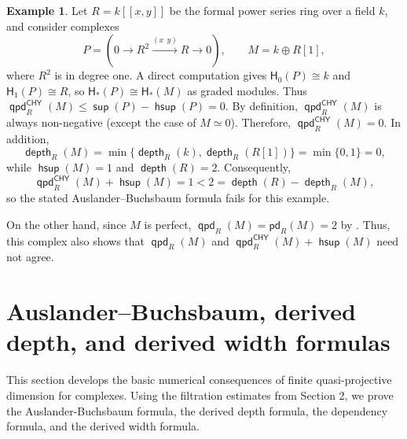 \documentclass[10pt, a4paper,reqno]{amsart}
\theoremstyle{definition}
\newtheorem{eg}[eg]{Example}
\theoremstyle{remark}
\numberwithin{equation}{thm}
\def\sH{\mathsf{H}}
\def\depth{\operatorname{\mathsf{depth}}}
\def\sup{\operatorname{\mathsf{sup}}}
\def\hsup{\operatorname{\mathsf{hsup}}}
\def\pd{\mathsf{pd}}
\def\qpd{\operatorname{\mathsf{qpd}}}
\begin{document}
\begin{eg}\label{eg:homology}
Let $R=k[[x,y]]$ be the formal power series ring over a field $k$, and consider complexes
\[
P=(0\longrightarrow R^2\xrightarrow{(x\ \ y)}R\longrightarrow0),\qquad M=k\oplus R[1],
\]
where $R^2$ is in degree one.
A direct computation gives $\sH_0(P)\cong k$ and $\sH_1(P)\cong R$, so $\sH_*(P)\cong\sH_*(M)$ as graded modules.
Thus $\qpd_R^{\mathsf{CHY}}(M)\leq\sup(P)-\hsup(P)=0$.
By definition, $\qpd_R^{\mathsf{CHY}}(M)$ is always non-negative (except the case of $M \simeq 0$).
Therefore, $\qpd_R^{\mathsf{CHY}}(M) = 0$.
In addition,
\[
\depth_R(M)=\min\{\depth_R(k),\depth_R(R[1])\}=\min\{0,1\}=0,
\]
while $\hsup(M)=1$ and $\depth(R)=2$.
Consequently,
\[
\qpd_R^{\mathsf{CHY}}(M)+\hsup(M) = 1<2=\depth(R) - \depth_R(M),
\]
so the stated Auslander--Buchsbaum formula fails for this example.

On the other hand, since $M$ is perfect, $\qpd_R(M) = \pd_R(M) = 2$ by .
Thus, this complex also shows that $\qpd_R(M)$ and $\qpd_R^{\mathsf{CHY}}(M) + \hsup(M)$ need not agree.
\end{eg}


\section{Auslander--Buchsbaum, derived depth, and derived width formulas}

This section develops the basic numerical consequences of finite quasi-projective dimension for complexes.
Using the filtration estimates from Section 2, we prove the Auslander-Buchsbaum formula, the derived depth formula, the dependency formula, and the derived width formula.
\end{document}
